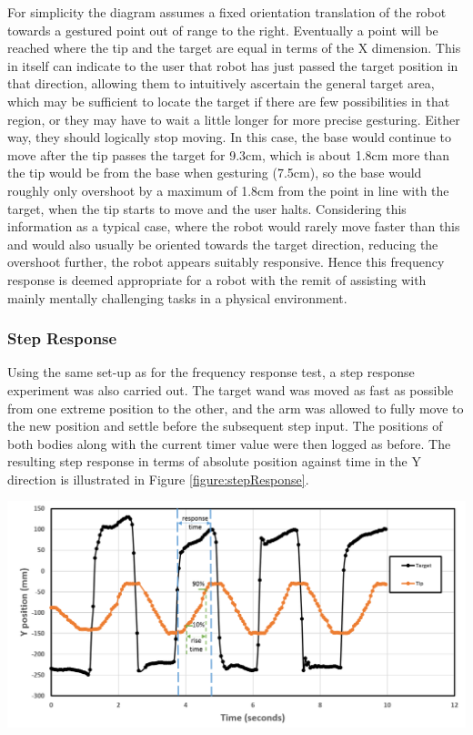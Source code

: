 \documentclass[11pt]{article}
\begin{document}
For simplicity the diagram assumes a fixed orientation translation of the robot towards a gestured point out of range to the right. Eventually a point will be reached where the tip and the target are equal in terms of the X dimension. This in itself can indicate to the user that robot has just passed the target position in that direction, allowing them to intuitively ascertain the general target area, which may be sufficient to locate the target if there are few possibilities in that region, or they may have to wait a little longer for more precise gesturing. Either way, they should logically stop moving. In this case, the base would continue to move after the tip passes the target for 9.3cm, which is about 1.8cm more than the tip would be from the base when gesturing (7.5cm), so the base would roughly only overshoot by a maximum of 1.8cm  from the point in line with the target, when the tip starts to move and the user halts. Considering this information as a typical case, where the robot would rarely move faster than this and would also usually be oriented towards the target direction, reducing the overshoot further, the robot appears suitably responsive. Hence this frequency response is deemed appropriate for a robot with the remit of assisting with mainly mentally challenging tasks in a physical environment. 



\subsubsection{Step Response}

Using the same set-up as for the frequency response test, a step response experiment was also carried out. The target wand was moved as fast as possible from one extreme position to the other, and the arm was allowed to fully move to the new position and settle before the subsequent step input. The positions of both bodies along with the current timer value were then logged as before. The resulting step response in terms of absolute position against time in the Y direction is illustrated in Figure \ref{figure:stepResponse}.

\begin{center}
\includegraphics[width=\textwidth]{images/stepResponse.png}
\label{figure:stepResponse}
\end{center}
\end{document}
